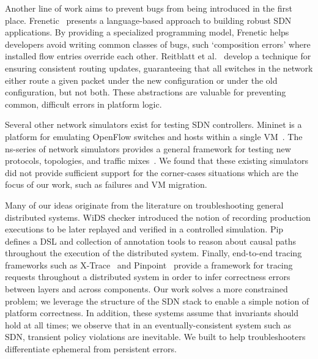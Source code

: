 Another line of work aims to prevent bugs from being introduced in the first
place. Frenetic~\cite{frenetic} presents a language-based approach to building
robust SDN applications. By providing a specialized programming model,
 Frenetic helps developers avoid writing common classes of
bugs, such `composition errors' where installed flow entries override each other.
Reitblatt et al.~\cite{consistentupdates} develop a technique for ensuring
consistent routing updates, guaranteeing that all switches in the network either route
a given packet under the new configuration or under the old configuration,
but not both. These abstractions are valuable for preventing common, difficult errors
in platform logic.

Several other network simulators exist for testing SDN controllers. Mininet is a 
platform for emulating OpenFlow switches and hosts within a single
 VM~\cite{Lantz:2010:NLR:1868447.1868466}. The ns-series of network simulators
provides a general framework for testing new protocols, topologies,
and traffic mixes~\cite{ns3}. We found that these existing simulators did
not provide sufficient support for the corner-cases situations which are the
focus of our work, such as failures and VM migration.

Many of our ideas originate from the literature on troubleshooting general
distributed systems. WiDS checker introduced the notion of recording
production executions to be later replayed and verified in a controlled simulation.
Pip~\cite{pip} defines a DSL and collection of annotation tools to
reason about causal paths throughout the execution of the
distributed system. Finally, end-to-end tracing
frameworks such as X-Trace~\cite{Fonseca:2007:XPN:1973430.1973450} and 
Pinpoint~\cite{Chen02pinpoint:problem} provide a framework for tracing requests throughout 
a distributed system in order to infer correctness errors between layers and
across components. Our work solves a more constrained problem; we leverage
the structure of the SDN stack to enable a simple notion of platform
correctness. In addition, these systems assume that invariants should hold at
all times; we observe that in an eventually-consistent system such as SDN,
transient policy violations are inevitable. We built \simulator{} to help troubleshooters
differentiate ephemeral from persistent errors. 


